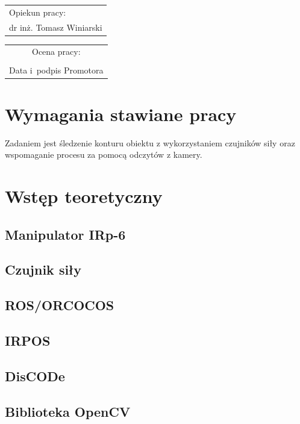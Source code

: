 \documentclass[12pt, a4paper, twoside]{book}
\begin{document}
\begin{titlepage}
			\vspace{20mm}
			\begin{flushright}
				\begin{tabular}{l}
					Opiekun pracy:\\
					\large dr inż. Tomasz Winiarski
				\end{tabular}
			\end{flushright}
			\vfill
			\begin{tabular}{c}
				\scriptsize Ocena pracy: \dotfill\\[10mm]
				\scriptsize \makebox[55mm]{\dotfill}\\
				\scriptsize Data i~podpis Promotora\\
				
			\end{tabular}
		\end{titlepage} 	


\newpage
\tableofcontents

\chapter{Wymagania stawiane pracy}
Zadaniem jest śledzenie konturu obiektu z wykorzystaniem czujników siły oraz wspomaganie procesu za pomocą odczytów z kamery.
\chapter{Wstęp teoretyczny}
	\section{Manipulator IRp-6}
	\section{Czujnik siły}
	\section{ROS/ORCOCOS}	
	\section{IRPOS}
	\section{DisCODe}
	\section{Biblioteka OpenCV}
\end{document}
